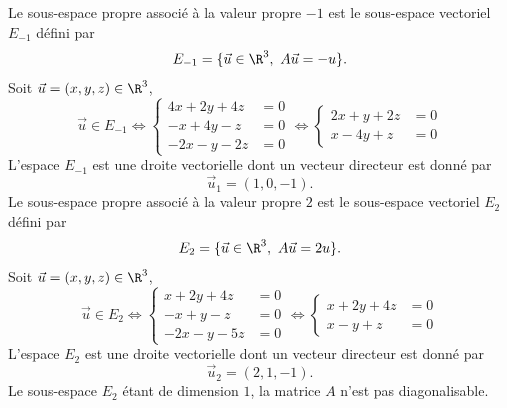 {\begin{enumerate}
{Le sous-espace propre associ\'e \`a la valeur propre $-1$ est le sous-espace vectoriel $E_{-1}$ d\'efini par
$$E_{-1}=\{\vec u\in\R^3,\ A\vec u=-u\}.$$
Soit $\vec u=(x,y,z)\in\R^3$, 
$$\vec u\in E_{-1}\iff \left\{\begin{aligned}4x+2y+4z&=0 \\  -x+4y-z&=0 \\  -2x-y-2z&=0\end{aligned}\right.
\iff\left\{ \begin{aligned}2x+y+2z&=0 \\  x-4y+z&=0 \end{aligned}\right.$$
L'espace $E_{-1}$ est une droite vectorielle dont un vecteur directeur est donn\'e par 
$$\vec u_1=(1,0,-1).$$
Le sous-espace propre associ\'e \`a la valeur propre $2$ est le sous-espace vectoriel $E_{2}$ d\'efini par
$$E_{2}=\{\vec u\in\R^3,\ A\vec u=2u\}.$$
Soit $\vec u=(x,y,z)\in\R^3$, 
$$\vec u\in E_{2}\iff \left\{\begin{aligned}x+2y+4z&=0 \\  -x+y-z&=0 \\  -2x-y-5z&=0\end{aligned}\right.
\iff \left\{\begin{aligned}x+2y+4z&=0 \\  x-y+z&=0 \end{aligned}\right.$$
L'espace $E_{2}$ est une droite vectorielle dont un vecteur directeur est donn\'e par 
$$\vec u_2=(2,1,-1).$$
Le sous-espace $E_2$ \'etant de dimension $1$, la matrice $A$ n'est pas diagonalisable.

}
\end{enumerate}}
